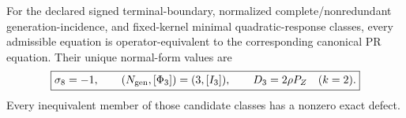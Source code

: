 \begin{theorem}
\label{thm:pr35-three-selector-equation-exhaustion}
For the declared signed terminal-boundary, normalized complete/nonredundant generation-incidence, and fixed-kernel minimal quadratic-response classes, every admissible equation is operator-equivalent to the corresponding canonical PR equation.  Their unique normal-form values are
\begin{equation}
 \boxed{
 \sigma_8=-1,
 \qquad
 (N_{\rm gen},[\Phi_3])=(3,[I_3]),
 \qquad
 D_3=2\rho P_Z\quad(k=2).}
 \label{eq:pr35-three-selector-equation-exhaustion}
\end{equation}
Every inequivalent member of those candidate classes has a nonzero exact defect.
\end{theorem}

